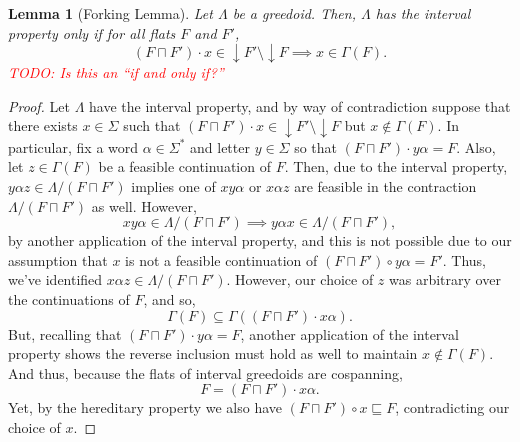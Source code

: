 \documentclass[11pt]{article}
\newtheorem{corollary}[theorem]{Corollary}
\newtheorem{lemma}[theorem]{Lemma}
\newcommand{\univ}{\Sigma}
\newcommand{\glang}{\Lambda}
\newcommand{\todo}[1]{\textcolor{red}{TODO: #1}}
\newcommand{\ideal}[1]{\mathop{\downarrow}#1}
\begin{document}

\iffalse
\begin{lemma}[Forking Lemma]\label{lem:interval-prop-implies-forks-fc} 
    Let $\glang$ be a greedoid.
    Then, $\glang$ has the interval property only if for all flats $F$ and $F'$,
    \[(F\sqcap F')\cdot x \in \ideal F'\setminus \ideal F \implies x\in\Gamma(F).\]
    \todo{Is this an ``if and only if?''}
\end{lemma}
\begin{proof}
    Let $\glang$ have the interval property, and by way of contradiction
    suppose that there exists $x\in\univ$ such that $(F\sqcap F')\cdot x \in
    \ideal F'\setminus \ideal F$ but $x\notin\Gamma(F)$. In particular, fix
    a word $\alpha \in \univ^*$ and letter $y \in \univ$ so that $(F\sqcap
    F')\cdot y \alpha = F$. Also, let $z \in \Gamma(F)$ be a feasible
    continuation of $F$. Then, due to the interval property, $y\alpha
    z\in\glang/(F\sqcap F')$ implies one of $x y \alpha$ or $x \alpha z$ are
    feasible in the contraction $\glang/(F\sqcap F')$ as well. However,
    \[
    xy\alpha \in \glang / (F\sqcap F') \implies y \alpha x \in\glang / (F\sqcap F'),
    \]
    by another application of the interval property, and this is not possible due to our assumption that $x$ is not a feasible
    continuation of $(F\sqcap F')\circ y\alpha = F'$.
    Thus, we've identified $x \alpha
    z \in \glang/(F\sqcap F')$. However, our choice of $z$ was arbitrary over
    the continuations of $F$, and so, 
    \[
        \Gamma(F) \subseteq \Gamma\left((F\sqcap F')\cdot x \alpha\right).
    \]
    But, recalling that $(F\sqcap F') \cdot y\alpha = F$, another application of the interval property shows the reverse inclusion must hold
    as well to maintain $x \notin \Gamma(F)$. And thus, because the flats of interval greedoids are cospanning,
    \[
        F = (F\sqcap F') \cdot x\alpha.
    \]
    Yet, by the hereditary property we also have
    $(F\sqcap F') \circ x \sqsubseteq F$, contradicting our choice of $x$.
\end{proof}
\end{document}

